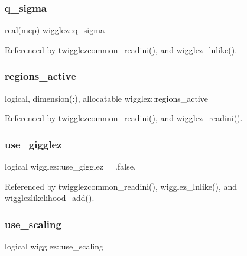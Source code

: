 \subsubsection{\texorpdfstring{q\+\_\+sigma}{q\_sigma}}
{\footnotesize\ttfamily real(mcp) wigglez\+::q\+\_\+sigma\hspace{0.3cm}{\ttfamily [private]}}



Referenced by twigglezcommon\+\_\+readini(), and wigglez\+\_\+lnlike().

\mbox{\label{namespacewigglez_a4bf753383300f61cecdd5c8cd8fdaae3}} 
\subsubsection{\texorpdfstring{regions\+\_\+active}{regions\_active}}
{\footnotesize\ttfamily logical, dimension(\+:), allocatable wigglez\+::regions\+\_\+active\hspace{0.3cm}{\ttfamily [private]}}



Referenced by twigglezcommon\+\_\+readini(), and wigglez\+\_\+readini().

\mbox{\label{namespacewigglez_a852cec3f5b6f650f8cfd9e8bdee9fc33}} 
\subsubsection{\texorpdfstring{use\+\_\+gigglez}{use\_gigglez}}
{\footnotesize\ttfamily logical wigglez\+::use\+\_\+gigglez = .false.\hspace{0.3cm}{\ttfamily [private]}}



Referenced by twigglezcommon\+\_\+readini(), wigglez\+\_\+lnlike(), and wigglezlikelihood\+\_\+add().

\mbox{\label{namespacewigglez_ae38c8e45630d25b0d97109dd26bc3cd4}} 
\subsubsection{\texorpdfstring{use\+\_\+scaling}{use\_scaling}}
{\footnotesize\ttfamily logical wigglez\+::use\+\_\+scaling\hspace{0.3cm}{\ttfamily [private]}}



